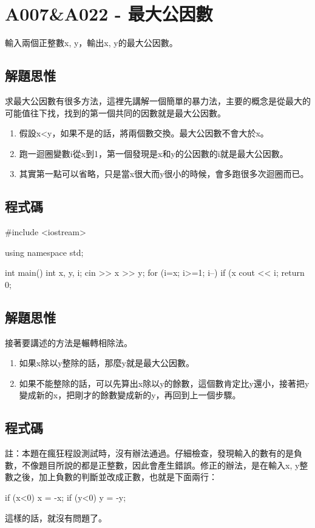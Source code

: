 \section{A007\&A022 - 最大公因數}
輸入兩個正整數x, y，輸出x, y的最大公因數。

\subsection{解題思惟}
求最大公因數有很多方法，這裡先講解一個簡單的暴力法，主要的概念是從最大的可能值往下找，找到的第一個共同的因數就是最大公因數。
\begin{enumerate}
\item 假設x<y，如果不是的話，將兩個數交換。最大公因數不會大於x。
\item 跑一迴圈變數i從x到1，第一個發現是x和y的公因數的i就是最大公因數。
\item 其實第一點可以省略，只是當x很大而y很小的時候，會多跑很多次迴圈而已。
\end{enumerate}

\subsection{程式碼}
\begin{cppcode}
#include <iostream>

using namespace std;

int main()
{
	int x, y, i;
	cin >> x >> y;
	for (i=x; i>=1; i--) {
		if (x%
	}
	cout << i;
	return 0;
}
\end{cppcode}

\subsection{解題思惟}
接著要講述的方法是輾轉相除法。
\begin{enumerate}
\item 如果x除以y整除的話，那麼y就是最大公因數。
\item 如果不能整除的話，可以先算出x除以y的餘數，這個數肯定比y還小，接著把y變成新的x，把剛才的餘數變成新的y，再回到上一個步驟。
\end{enumerate}
\subsection{程式碼}
註：本題在瘋狂程設測試時，沒有辦法通過。仔細檢查，發現輸入的數有的是負數，不像題目所說的都是正整數，因此會產生錯誤。修正的辦法，是在輸入x, y整數之後，加上負數的判斷並改成正數，也就是下面兩行：
\begin{inside}
if (x<0) x = -x;
if (y<0) y = -y;
\end{inside}
這樣的話，就沒有問題了。
